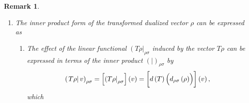 \documentclass[aps,preprint]{revtex4}
\newtheorem{remark}[theorem]{Remark}
\begin{document}
\begin{remark}
\begin{enumerate}
\begin{eqnarray}
\begin{array}{ccc}
T\right) _{12r} \\ 
\vdots & \ddots & \vdots \\ 
\mathcal{R}_{e}\left( T\right) _{2r1} & \cdots & \mathcal{R}_{e}\left(
T\right) _{2r2r}%
\end{array}%
\right) \left( 
\begin{array}{c}
\mathcal{R}_{e}\left( \rho \right) _{1} \\ 
\vdots \\ 
\mathcal{R}_{e}\left( \rho \right) _{2r}%
\end{array}%
\right) ,
\end{eqnarray}%
showing that 
\begin{equation}
\mathcal{R}_{e_{d}}\left( d\left( T\right) \right) =\left( 
\begin{array}{ccc}
\mathcal{R}_{e}\left( T\right) _{11} & \cdots & \mathcal{R}_{e}\left(
T\right) _{12r} \\ 
\vdots & \ddots & \vdots \\ 
\mathcal{R}_{e}\left( T\right) _{2r1} & \cdots & \mathcal{R}_{e}\left(
T\right) _{2r2r}%
\end{array}%
\right) .
\end{equation}

\item The inner product form of the transformed dualized vector $\rho $ can
be expressed as

\begin{enumerate}
\item The effect of the linear functional $\left( T\rho \right\vert _{\rho
\sigma }$ induced by the vector $T\rho $ can be expressed in terms of the
inner product $\left( \left. {}\right\vert \right) _{\rho \sigma }$ by 
\begin{equation}
\left( \left. T\rho \right\vert v\right) _{\rho \sigma }=\left[ \left( T\rho
\right\vert _{\rho \sigma }\right] \left( v\right) =\left[ \overset{}{%
d\left( T\right) \left( \overset{}{d_{\rho \sigma }\left( \rho \right) }%
\right) }\right] \left( v\right) ,
\end{equation}%
which


\end{enumerate}
\end{enumerate}
\end{remark}
\end{document}
